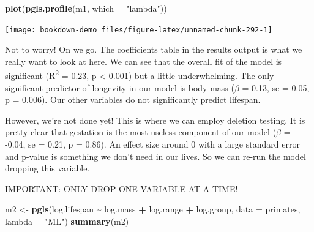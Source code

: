 \documentclass[
]{book}
\newenvironment{Shaded}{\begin{snugshade}}{\end{snugshade}}
\newcommand{\DataTypeTok}[1]{\textcolor[rgb]{0.13,0.29,0.53}{#1}}
\newcommand{\KeywordTok}[1]{\textcolor[rgb]{0.13,0.29,0.53}{\textbf{#1}}}
\newcommand{\NormalTok}[1]{#1}
\newcommand{\OperatorTok}[1]{\textcolor[rgb]{0.81,0.36,0.00}{\textbf{#1}}}
\newcommand{\StringTok}[1]{\textcolor[rgb]{0.31,0.60,0.02}{#1}}
\begin{document}
\begin{Shaded}
\begin{Highlighting}[]
\KeywordTok{plot}\NormalTok{(}\KeywordTok{pgls.profile}\NormalTok{(m1, }\DataTypeTok{which =} \StringTok{"lambda"}\NormalTok{))}
\end{Highlighting}
\end{Shaded}

\begin{center}\texttt{[image: bookdown-demo\_files/figure-latex/unnamed-chunk-292-1]} \end{center}

Not to worry! On we go. The coefficients table in the results output is what we really want to look at here. We can see that the overall fit of the model is significant (R\textsuperscript{2} = 0.23, p \textless{} 0.001) but a little underwhelming. The only significant predictor of longevity in our model is body mass (\(\beta\) = 0.13, se = 0.05, p = 0.006). Our other variables do not significantly predict lifespan.

However, we're not done yet! This is where we can employ deletion testing. It is pretty clear that gestation is the most useless component of our model (\(\beta\) = -0.04, se = 0.21, p = 0.86). An effect size around 0 with a large standard error and p-value is something we don't need in our lives. So we can re-run the model dropping this variable.

IMPORTANT: ONLY DROP ONE VARIABLE AT A TIME!

\begin{Shaded}
\begin{Highlighting}[]
\NormalTok{m2 \textless{}{-}}\StringTok{ }\KeywordTok{pgls}\NormalTok{(log.lifespan }\OperatorTok{\textasciitilde{}}\StringTok{ }\NormalTok{log.mass }\OperatorTok{+}\StringTok{ }\NormalTok{log.range }\OperatorTok{+}\StringTok{ }\NormalTok{log.group,}
           \DataTypeTok{data =}\NormalTok{ primates, }\DataTypeTok{lambda =} \StringTok{"ML"}\NormalTok{)}
\KeywordTok{summary}\NormalTok{(m2)}
\end{Highlighting}
\end{Shaded}
\end{document}
